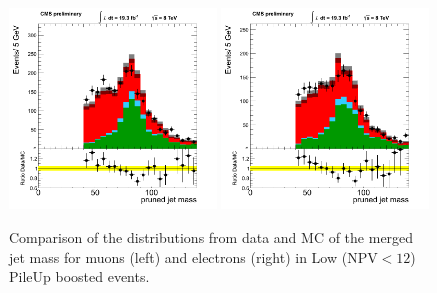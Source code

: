 \begin{figure}[h!t]
  {\centering
    \includegraphics[width=0.49\textwidth]{figs/puchecks/mu_LowNPV_GroomedJet_mass.png}
    \includegraphics[width=0.49\textwidth]{figs/puchecks/el_LowNPV_GroomedJet_mass.png}
    \caption{Comparison of the distributions from data and MC of the
    merged jet mass for muons (left) and electrons (right)
    in Low (NPV$<12$) PileUp boosted events.}
\label{fig:pu_GroomedJet_massLow}}
\end{figure}
